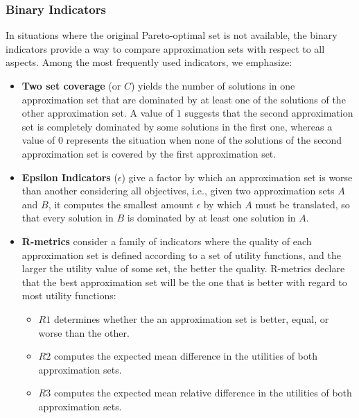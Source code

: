 	\subsubsection{Binary Indicators}
	In situations where the original Pareto-optimal set is not available, the binary indicators provide a way to compare approximation sets with respect to all aspects. Among the most frequently used indicators, we emphasize:
	\begin{itemize}
		\item \textbf{Two set coverage} (or $C$) yields the number of solutions in one approximation set that are dominated by at least one of the solutions of the other approximation set. A value of $1$ suggests that the second approximation set is completely dominated by some solutions in the first one, whereas a value of $0$ represents the situation when none of the solutions of the second approximation set is covered by the first approximation set.
		
		\item \textbf{Epsilon Indicators} ($\epsilon$) give a factor by which an approximation set is worse than another considering all objectives, i.e., given two approximation sets $A$ and $B$, it computes the smallest amount $\epsilon$ by which $A$ must be translated, so that every solution in $B$ is dominated by at least one solution in $A$.
		
		\item \textbf{R-metrics} consider a family of indicators where the quality of each approximation set is defined according to a set of utility functions, and the larger the utility value of some set, the better the quality. R-metrics declare that the best approximation set will be the one that is better with regard to most utility functions:
		\begin{itemize}
			\item \textbf{$R1$} determines whether the an approximation set is better, equal, or worse than the other. 
			\item \textbf{$R2$} computes the expected mean difference in the utilities of both approximation sets.
			\item \textbf{$R3$} computes the expected mean relative difference in the utilities of both approximation sets.
		\end{itemize}
	\end{itemize}
	
